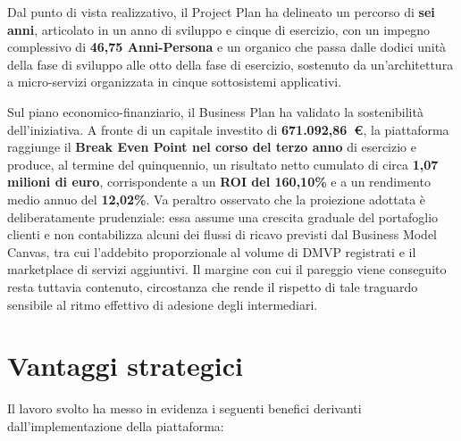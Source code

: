Dal punto di vista realizzativo, il Project Plan ha delineato un percorso di \textbf{sei anni}, articolato in un anno di sviluppo e cinque di esercizio, con un impegno complessivo di \textbf{46,75 Anni-Persona} e un organico che passa dalle dodici unit\`a della fase di sviluppo alle otto della fase di esercizio, sostenuto da un'architettura a micro-servizi organizzata in cinque sottosistemi applicativi.

Sul piano economico-finanziario, il Business Plan ha validato la sostenibilit\`a dell'iniziativa. A fronte di un capitale investito di \textbf{671.092,86~\euro{}}, la piattaforma raggiunge il \textbf{Break Even Point nel corso del terzo anno} di esercizio e produce, al termine del quinquennio, un risultato netto cumulato di circa \textbf{1,07 milioni di euro}, corrispondente a un \textbf{ROI del 160,10\%} e a un rendimento medio annuo del \textbf{12,02\%}. Va peraltro osservato che la proiezione adottata \`e deliberatamente prudenziale: essa assume una crescita graduale del portafoglio clienti e non contabilizza alcuni dei flussi di ricavo previsti dal Business Model Canvas, tra cui l'addebito proporzionale al volume di DMVP registrati e il marketplace di servizi aggiuntivi. Il margine con cui il pareggio viene conseguito resta tuttavia contenuto, circostanza che rende il rispetto di tale traguardo sensibile al ritmo effettivo di adesione degli intermediari.

\section*{Vantaggi strategici}

Il lavoro svolto ha messo in evidenza i seguenti benefici derivanti dall'implementazione della piattaforma:


